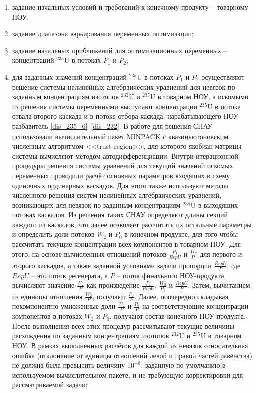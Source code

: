 \begin{enumerate}
    \item задание начальных условий и требований к конечному продукту -- товарному НОУ;
    \item задание диапазона варьирования переменных оптимизации;    
    \item задание начальных приближений для оптимизационных переменных -- концентраций $^{235}$U в потоках $P_1$ и $P_2$;
    \item для заданных значений концентраций $^{235}$U в потоках $P_1$ и $P_2$ осуществляют решение системы нелинейных алгебраических уравнений для невязок по заданным концентрациям изотопов $^{232}$U и $^{235}$U в товарном НОУ, а искомыми из решения системы переменными выступают концентрации $^{235}$U в потоке отвала второго каскада и в потоке отбора каскада, нарабатывающего НОУ-разбавитель \ref{dis_235_6}--\ref{dis_232}. В работе для решения СНАУ использовали вычислительный пакет MINPACK \cite{moreMINPACK} с квазиньютоновским численным алгоритмом <<trust-region>>, для которого якобиан матрицы системы вычисляют методом автодифференциации. Внутри итерационной процедуры решения системы уравнений для текущий значений искомых переменных проводили расчёт основных параметров входящих в схему одиночных ординарных каскадов. Для этого также используют методы численного решения систем нелинейных алгебраических уравнений, возникающих для невязок по заданным концентрациям $^{235}$U в выходящих потоках каскадов. Из решения таких СНАУ определяют длины секций каждого из каскадов, что далее позволяет рассчитать их остальные параметры и определить доли потоков $W_2$ и $P_0$ в конечном продукте, для того чтобы рассчитать текущие концентрации всех компонентов в товарном НОУ. Для этого, на основе вычисленных отношений потоков $\frac{P_{1}}{RepU}$ и $\frac{W_{2}}{P_{1}}$ для первого и второго каскадов, а также заданной условиями задачи пропорции $\frac{RepU}{P}$, где $RepU$ -- это поток регенерата, а $P$ -- поток финального НОУ-продукта, вычисляют значение $\frac{W_{2}}{P}$ как произведение $\frac{P_{1}}{RepU}$, $\frac{W_{2}}{P_{1}}$ и $\frac{RepU}{P}$. Затем, вычитанием из единицы отношения $\frac{W_{2}}{P}$, получают $\frac{P_{0}}{P}$. Далее, поочередно складывая покомпонентно умноженные доли $\frac{W_{2}}{P}$ и $\frac{P_{0}}{P}$ на соответствующие концентрации компонентов в потоках $W_2$ и $P_0$, получают состав конечного НОУ-продукта. После выполнения всех этих процедур рассчитывают текущие величины расхождения по заданным концентрациям изотопов $^{232}$U и $^{235}$U в товарном НОУ. В рамках выполненных расчётов для каждой из невязок относительная ошибка (отклонение от единицы отношений левой и правой частей равенства) не должна была превысить величину $10^{-8}$, заданную по умолчанию в используемом вычислительном пакете, и не требующую корректировки для рассматриваемой задачи;

\end{enumerate}
